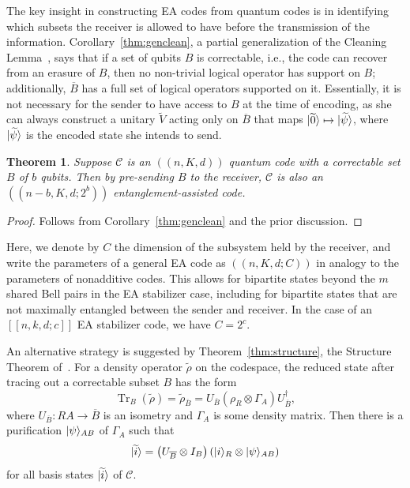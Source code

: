 \documentclass[]{amsart}
\DeclarePairedDelimiter\ket{\lvert}{\rangle}
\DeclareMathOperator{\Tr}{Tr}
\newtheorem{theorem}{Theorem}
\begin{document}
The key insight in constructing EA codes from quantum codes is in identifying which subsets the receiver is allowed to have before the transmission of the information.
Corollary~\ref{thm:genclean}, a partial generalization of the Cleaning Lemma~\cite{BT2009}, says that if a set of qubits $B$ is correctable, i.e., the code can recover from an erasure of $B$, then no non-trivial logical operator has support on $B$; additionally, $\overline{B}$ has a full set of logical operators supported on it.
Essentially, it is not necessary for the sender to have access to $B$ at the time of encoding, as she can always construct a unitary $\widetilde{V}$ acting only on $\overline{B}$ that maps $\ket{\widetilde{0}}\mapsto\ket{\widetilde{\psi}}$, where $\ket{\widetilde{\psi}}$ is the encoded state she intends to send.

\begin{theorem}\label{thm:easendahead}
    Suppose $\mathcal{C}$ is an $\left(\!\left(n,K,d\right)\!\right)$ quantum code with a correctable set $B$ of $b$ qubits.
    Then by pre-sending $B$ to the receiver, $\mathcal{C}$ is also an $\left(\!\left(n-b,K,d;2^b\right)\!\right)$ entanglement-assisted code.
\end{theorem}
\begin{proof}
    Follows from Corollary~\ref{thm:genclean} and the prior discussion.
\end{proof}

Here, we denote by $C$ the dimension of the subsystem held by the receiver, and write the parameters of a general EA code as $\left(\!\left(n,K,d;C\right)\!\right)$ in analogy to the parameters of nonadditive codes.
This allows for bipartite states beyond the $m$ shared Bell pairs in the EA stabilizer case, including for bipartite states that are not maximally entangled between the sender and receiver.
In the case of an $\left[\!\left[n,k,d;c\right]\!\right]$ EA stabilizer code, we have $C=2^c$.

An alternative strategy is suggested by Theorem~\ref{thm:structure}, the Structure Theorem of~\cite{CHKNN2025}.
For a density operator $\widetilde{\rho}$ on the codespace, the reduced state after tracing out a correctable subset $B$ has the form
\begin{equation}
    \Tr_B\!\left(\widetilde{\rho}\right)=\widetilde{\rho}_{\overline{B}} =U_{\overline{B}}\left(\rho_R\otimes\Gamma_A\right)U_{\overline{B}}^\dagger,
\end{equation}
where $U_{\overline{B}}:RA\rightarrow \overline{B}$ is an isometry and $\Gamma_A$ is some density matrix.
Then there is a purification $\ket{\psi}_{AB}$ of $\Gamma_A$ such that
\begin{equation}
    \ket{\widetilde{i}}=\left(U_{\overline{B}}\otimes I_B\right)\left(\ket{i}_R\otimes\ket{\psi}_{AB}\right)
\end{equation}
for all basis states $\ket{\widetilde{i}}$ of $\mathcal{C}$.
\end{document}
